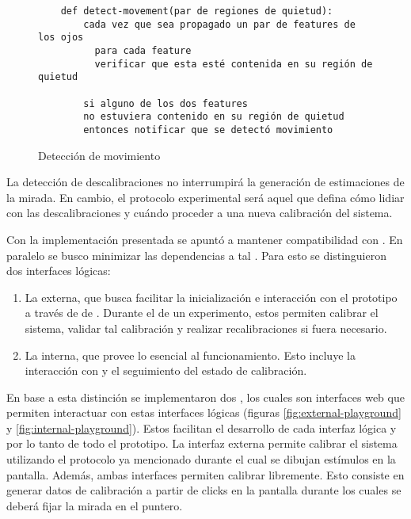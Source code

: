   \begin{figure}
    \begin{verbatim}
    def detect-movement(par de regiones de quietud):
        cada vez que sea propagado un par de features de los ojos
          para cada feature
          verificar que esta esté contenida en su región de quietud

        si alguno de los dos features
        no estuviera contenido en su región de quietud
        entonces notificar que se detectó movimiento\end{verbatim}
    \caption{Detección de movimiento}
    \label{fig:movement-detection}
  \end{figure}

  La detección de descalibraciones no interrumpirá la generación de
  estimaciones de la mirada.
  En cambio, el protocolo experimental será aquel que defina cómo lidiar con
  las descalibraciones y cuándo proceder a una nueva calibración del sistema.

  Con la implementación presentada se apuntó a mantener compatibilidad con
  \jspsych.
  En paralelo se busco minimizar las dependencias a tal \framework.
  Para esto se distinguieron dos interfaces lógicas:
  \begin{enumerate}
    \item
      La externa, que busca facilitar la inicialización e interacción con el
      prototipo a través de \timelines de \jspsych.
      Durante el \runtime de un experimento, estos permiten calibrar el
      sistema, validar tal calibración y realizar recalibraciones si fuera
      necesario.
    \item
      La interna, que provee lo esencial al funcionamiento.
      Esto incluye la interacción con \webgazer y el seguimiento del estado de
      calibración.
  \end{enumerate}
  En base a esta distinción se implementaron dos \playgrounds, los cuales son
  interfaces web que permiten interactuar con estas interfaces lógicas (figuras
  \ref{fig:external-playground} y \ref{fig:internal-playground}).
  Estos facilitan el desarrollo de cada interfaz lógica y por lo tanto de todo
  el prototipo.
  La interfaz externa permite calibrar el sistema utilizando el protocolo ya
  mencionado durante el cual se dibujan estímulos en la pantalla.
  Además, ambas interfaces permiten calibrar libremente.
  Esto consiste en generar datos de calibración a partir de clicks en la
  pantalla durante los cuales se deberá fijar la mirada en el puntero.

